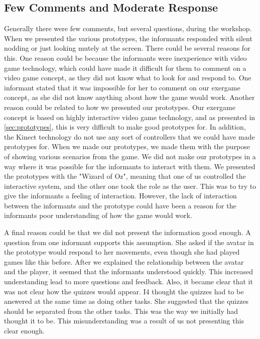 \subsection{Few Comments and Moderate Response}
Generally there were few comments, but several questions, during the workshop. When we presented the various prototypes, the informants responded with silent nodding or just looking mutely at the screen. There could be several reasons for this. One reason could be because the informants were inexperience with video game technology, which could have made it difficult for them to comment on a video game concept, as they did not know what to look for and respond to. One informant stated that it was impossible for her to comment on our exergame concept, as she did not know anything about how the game would work. Another reason could be related to how we presented our prototypes. Our exergame concept is based on highly interactive video game technology, and as presented in \ref{sec:prototypes}, this is very difficult to make good prototypes for. In addition, the Kinect technology do not use any sort of controllers that we could have made prototypes for. When we made our prototypes, we made them with the purpose of showing various scenarios from the game. We did not make our prototypes in a way where it was possible for the informants to interact with them. We presented the prototypes with the "Wizard of Oz", meaning that one of us controlled the interactive system, and the other one took the role as the user. This was to try to give the informants a feeling of interaction. However, the lack of interaction between the informants and the prototype could have been a reason for the informants poor understanding of how the game would work. 

A final reason could be that we did not present the information good enough. A question from one informant supports this assumption. She asked if the avatar in the prototype would respond to her movements, even though she had played games like this before. After we explained the relationship between the avatar and the player, it seemed that the informants understood quickly. This increased understanding lead to more questions and feedback. Also, it became clear that it was not clear how the quizzes would appear. I4 thought the quizzes had to be answered at the same time as doing other tasks. She suggested that the quizzes should be separated from the other tasks. This was the way we initially had thought it to be. This misunderstanding was a result of us not presenting this clear enough.

